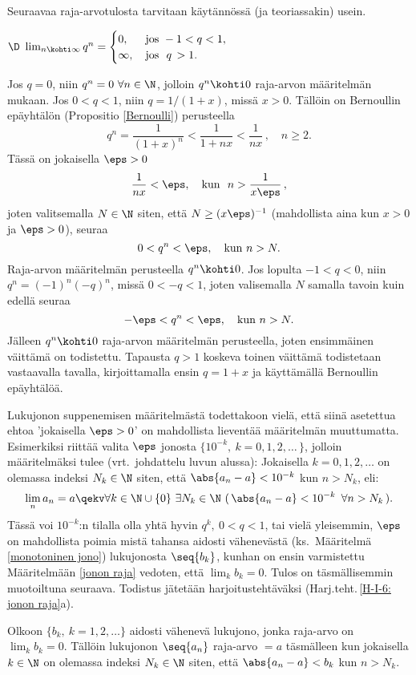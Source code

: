 Seuraavaa raja-arvotulosta tarvitaan käytännössä (ja teoriassakin) usein.
\begin{Prop} \label{potenssilimes} $\D \
\lim_{n \kohti \infty} q^n = \begin{cases}     
                                 0,      \quad\,\ \text{jos}\ -1 < q < 1,  \\
                                 \infty, \quad    \text{jos}\ \    q\,> 1.
                             \end{cases} $
\end{Prop}
\tod Jos $q=0$, niin $q^n = 0\ \forall n \in \N$, jolloin $q^n \kohti 0$ raja-arvon määritelmän
mukaan. Jos $0<q<1$, niin $q = 1/(1+x)$, missä $x>0$. Tällöin on Bernoullin epäyhtälön 
(Propositio \ref{Bernoulli}) perusteella
\[
q^n = \frac{1}{(1+x)^n} < \frac{1}{1+nx} < \frac{1}{nx}\,, \quad n \ge 2.
\]
Tässä on jokaisella $\eps>0$
\[
\frac{1}{nx} < \eps, \quad \text{kun}\ \ n > \frac{1}{x \eps}\,,
\]
joten valitsemalla $N\in\N$ siten, että $N \ge (x \eps)^{-1}$ (mahdollista aina kun $x>0$
ja $\eps > 0$), seuraa
\[
0 < q^n < \eps, \quad \text{kun}\ n > N.
\]
Raja-arvon määritelmän perusteella $q^n \kohti 0$. Jos lopulta $-1 < q < 0$, niin
$q^n = (-1)^n (-q)^n$, missä $0 < -q < 1$, joten valisemalla $N$ samalla tavoin kuin
edellä seuraa
\[
-\eps < q^n < \eps, \quad \text{kun}\ n > N.
\]
Jälleen $q^n \kohti 0$ raja-arvon määritelmän perusteella, joten ensimmäinen väittämä on 
todistettu. Tapausta $q>1$ koskeva toinen väittämä todistetaan vastaavalla tavalla,
kirjoittamalla ensin $q = 1+x$ ja käyttämällä Bernoullin epäyhtälöä. \loppu

Lukujonon suppenemisen määritelmästä todettakoon vielä, että siinä asetettua ehtoa 
'jokaisella $\eps>0$' on mahdollista lieventää määritelmän muuttumatta. Esimerkiksi riittää
valita $\eps$ jonosta $\{10^{-k},\ k=0,1,2,\ldots\,\}$, jolloin määritelmäksi tulee
(vrt.\ johdattelu luvun alussa): Jokaisella $k=0,1,2,\ldots$ on olemassa indeksi $N_k\in\N$
siten, että $\abs{a_n-a} < 10^{-k}$ kun $n>N_k$, eli:
\[
\lim_n a_n = a 
\qekv \forall k\in\N\cup\{0\}\ \exists N_k\in\N\ (\,\abs{a_n-a} < 10^{-k}\ \,\forall n > N_k\,).
\]
Tässä voi $10^{-k}$:n tilalla olla yhtä hyvin $q^k,\ 0<q<1$, tai vielä yleisemmin, $\eps$ on
mahdollista poimia mistä tahansa aidosti vähenevästä (ks.\ Määritelmä \ref{monotoninen jono})
lukujonosta $\seq{b_k}$, kunhan on ensin varmistettu Määritelmään \ref{jonon raja} vedoten, että
$\lim_k b_k=0$. Tulos on täsmällisemmin muotoiltuna seuraava. Todistus jätetään
harjoitustehtäväksi (Harj.teht.\,\ref{H-I-6: jonon raja}a).
\begin{Prop} \label{jonon raja 2} Olkoon $\{b_k,\ k=1,2,\ldots\}$ aidosti vähenevä lukujono,
jonka raja-arvo on $\lim_k b_k = 0$. Tällöin lukujonon $\seq{a_n}$ raja-arvo $=a$ täsmälleen
kun jokaisella $k\in\N$ on olemassa indeksi $N_k\in\N$ siten, että $\abs{a_n-a}<b_k$ kun $n>N_k$.
\end{Prop}

